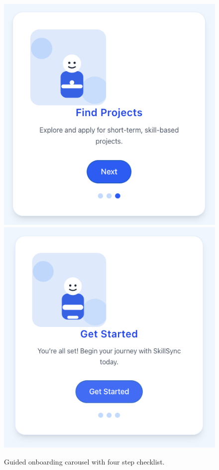 \begin{figure}[H]
{\begin{minipage}[b]{0.42\textwidth}
    \end{minipage}\hspace{1.5em}%
    \begin{minipage}[b]{0.42\textwidth}
      \centering
      \includegraphics[width=\linewidth]{figures/Onboarding-3.png}\\[0.3em]
      \includegraphics[width=\linewidth]{figures/Onboarding-4.png}
    \end{minipage}}
  \caption{Guided onboarding carousel with four step checklist.}
  \label{fig:onboarding-flow}
\end{figure}

